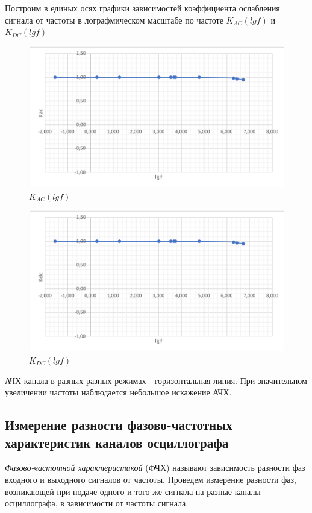 \documentclass[a4paper,12pt]{article} %
\begin{document}
Построим в единых осях графики зависимостей коэффициента ослабления сигнала от частоты в лографмическом масштабе по частоте $K_{AC}(lg f)$ и $K_{DC} (lg f)$%
\begin{figure}[!h]
\begin{center}
\includegraphics[width=1\textwidth]{1}
\end{center}
\caption{$K_{AC}(lg f)$ } \label{dz1}


\end{figure}
\begin{figure}[!h]
\begin{center}
\includegraphics[width=1\textwidth]{2}
\end{center}
\caption{$K_{DC}(lg f)$ } \label{dz2}
\end{figure}
\newpage
АЧХ канала в разных разных режимах - горизонтальная линия. При значительном увеличении частоты наблюдается небольшое искажение АЧХ.
\subsection{Измерение разности фазово-частотных характеристик каналов осциллографа}
\textit{Фазово-частотной характеристикой} (ФЧХ) называют зависимость разности фаз входного и выходного сигналов от частоты. Проведем измерение разности фаз, возникающей при подаче одного и того же сигнала на разные каналы осциллографа, в зависимости от частоты сигнала.
\end{document}
